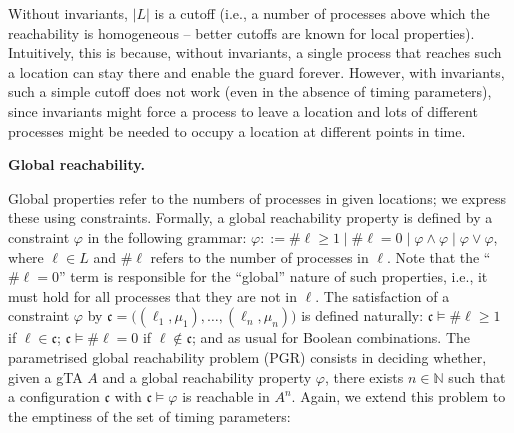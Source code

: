  
 
 
Without invariants, $|L|$ is a cutoff (i.e., a number of processes above which the reachability is homogeneous -- better cutoffs are known for local properties). Intuitively, this is because, without invariants, a single process that reaches such a location can stay there and enable the guard forever. However, with invariants, such a simple cutoff does not work (even in the absence of timing parameters), since invariants might force a process to leave a location and lots of different processes might be needed to occupy a location at different points in time.\par
 
 
 
 
\par\medskip\noindent\textbf{Global reachability.}\par
 
 
Global properties refer to the numbers of processes in given locations; we express these using constraints. Formally, a global reachability property is defined by a constraint $\varphi$ in the following grammar: $\varphi::=\#\mathrm{\ell}\geq 1\mid\#\mathrm{\ell}=0\mid\varphi\land\varphi\mid\varphi\lor\varphi$, where $\mathrm{\ell}\in L$ and $\#\mathrm{\ell}$ refers to the number of processes in $\mathrm{\ell}$. Note that the “$\#\mathrm{\ell}=0$” term is responsible for the “global” nature of such properties, i.e., it must hold for all processes that they are not in $\mathrm{\ell}$. The satisfaction of a constraint $\varphi$ by $\mathfrak{c}=\big((\mathrm{\ell}_{1},\mu_{1}),\ldots,(\mathrm{\ell}_{n},\mu_{n})\big)$ is defined naturally: $\mathfrak{c}\models\#\mathrm{\ell}\geq 1$ if $\mathrm{\ell}\in\mathfrak{c}$; $\mathfrak{c}\models\#\mathrm{\ell}=0$ if $\mathrm{\ell}\notin\mathfrak{c}$; and as usual for Boolean combinations. The parametrised global reachability problem (PGR) consists in deciding whether, given a gTA ${A}$ and a global reachability property $\varphi$, there exists $n\in\mathbb{N}$ such that a configuration $\mathfrak{c}$ with $\mathfrak{c}\models\varphi$ is reachable in ${{A}}^{n}$. Again, we extend this problem to the emptiness of the set of timing parameters:\par
 
